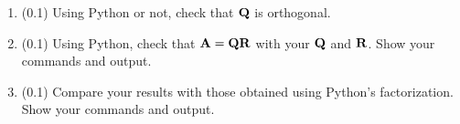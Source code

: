 \begin{enumerate}
\begin{enumerate}
\item (0.1) Using Python or not, check that $\mbox{${\bf Q}$}$ is orthogonal.

\item (0.1) Using Python, check that $\mbox{${\bf A}$} = \mbox{${\bf Q}$}\mbox{${\bf R}$}$ with your $\mbox{${\bf Q}$}$ and $\mbox{${\bf R}$}$. Show your commands and output.

\item (0.1) Compare your results with those obtained using Python's factorization. Show your commands and output.
\end{enumerate}

\end{enumerate}

